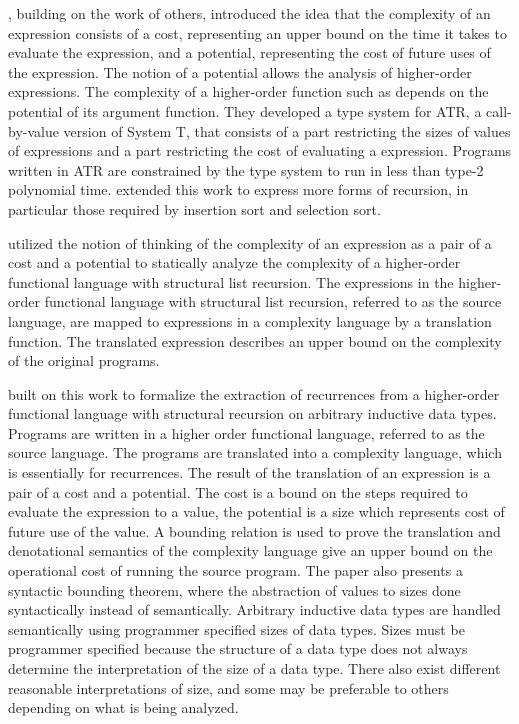\citet{Danner2007}, building on the work of others, introduced the
idea that the complexity of an expression consists of a cost, representing an
upper bound on the time it takes to evaluate the expression, and a potential,
representing the cost of future uses of the expression.  The notion of a
potential allows the analysis of higher-order expressions.  The complexity of a
higher-order function such as  depends on the potential of its argument
function.  They developed a type system for ATR, a call-by-value version of
System T, that consists of a part restricting the sizes of values of
expressions and a part restricting the cost of evaluating a expression.
Programs written in ATR are constrained by the type system to run in less
than type-2 polynomial time.  \citet{Danner2009} extended this work to express
more forms of recursion, in particular those required by insertion sort and
selection sort.



\citet{Danner2013} utilized the notion of thinking of the complexity of an
expression as a pair of a cost and a potential to statically analyze the
complexity of a higher-order functional language with structural list
recursion.  The expressions in the higher-order functional language with
structural list recursion, referred to as the source language, are mapped to
expressions in a complexity language by a translation function.  The translated
expression describes an upper bound on the complexity of the original programs.



\citet{Danner2015} built on this work to formalize the extraction
of recurrences from a higher-order functional language with structural
recursion on arbitrary inductive data types. Programs are written in a higher
order functional language, referred to as the source language. The programs are
translated into a complexity language, which is essentially for recurrences.
The result of the translation of an expression is a pair of a cost and a
potential. The cost is a bound on the steps required to evaluate the expression
to a value, the potential is a size which represents cost of future use of the
value. A bounding relation is used to prove the translation and denotational
semantics of the complexity language give an upper bound on the operational
cost of running the source program. The paper also presents a syntactic
bounding theorem, where the abstraction of values to sizes done syntactically
instead of semantically.  Arbitrary inductive data types are handled
semantically using programmer specified sizes of data types. Sizes must be
programmer specified because the structure of a data type does not always
determine the interpretation of the size of a data type. There also exist
different reasonable interpretations of size, and some may be preferable to
others depending on what is being analyzed.



